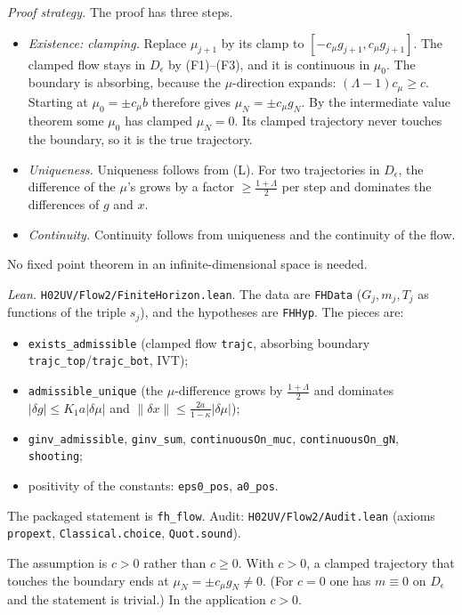 \documentclass[11pt]{amsart}
\theoremstyle{definition}
\theoremstyle{remark}
\numberwithin{equation}{section}
\begin{document}
\emph{Proof strategy.} The proof has three steps.
\begin{itemize}
\item \emph{Existence: clamping.} Replace $\mu_{j+1}$ by its clamp to $[-c_\mu g_{j+1},c_\mu g_{j+1}]$.
  The clamped flow stays in $D_\epsilon$ by (F1)--(F3), and it is continuous in $\mu_0$. The
  boundary is absorbing, because the $\mu$-direction expands: $(\Lambda-1)c_\mu\ge c$. Starting at
  $\mu_0=\pm c_\mu b$ therefore gives $\mu_N=\pm c_\mu g_N$. By the intermediate value theorem
  some $\mu_0$ has clamped $\mu_N=0$. Its clamped trajectory never touches the boundary, so it
  is the true trajectory.
\item \emph{Uniqueness.} Uniqueness follows from (L). For two trajectories in $D_\epsilon$, the
  difference of the $\mu$'s grows by a factor $\ge\frac{1+\Lambda}2$ per step and dominates the
  differences of $g$ and $x$.
\item \emph{Continuity.} Continuity follows from uniqueness and the continuity of the flow.
\end{itemize}
No fixed point theorem in an infinite-dimensional space is needed.

\emph{Lean.} \texttt{H02UV/Flow2/FiniteHorizon.lean}. The data are \texttt{FHData} ($G_j,m_j,T_j$ as
functions of the triple $s_j$), and the hypotheses are \texttt{FHHyp}. The pieces are:
\begin{itemize}
\item \texttt{exists\_admissible} (clamped flow \texttt{trajc}, absorbing boundary
  \texttt{trajc\_top}/\texttt{trajc\_bot}, IVT);
\item \texttt{admissible\_unique} (the $\mu$-difference grows by $\frac{1+\Lambda}2$ and dominates
  $|\delta g|\le K_1a|\delta\mu|$ and $\|\delta x\|\le\frac{2a}{1-\kappa}|\delta\mu|$);
\item \texttt{ginv\_admissible}, \texttt{ginv\_sum}, \texttt{continuousOn\_muc},
  \texttt{continuousOn\_gN}, \texttt{shooting};
\item positivity of the constants: \texttt{eps0\_pos}, \texttt{a0\_pos}.
\end{itemize}
The packaged statement is \texttt{fh\_flow}. Audit: \texttt{H02UV/Flow2/Audit.lean} (axioms
\texttt{propext}, \texttt{Classical.choice}, \texttt{Quot.sound}).

The assumption is $c>0$ rather than $c\ge0$. With $c>0$, a clamped trajectory that touches the
boundary ends at $\mu_N=\pm c_\mu g_N\ne0$. (For $c=0$ one has $m\equiv0$ on $D_\epsilon$ and the
statement is trivial.) In the application $c>0$.
\end{document}

